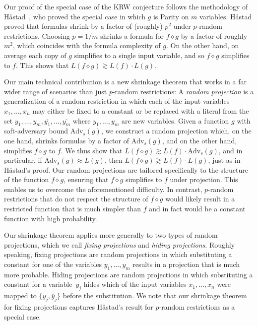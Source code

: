 \documentclass[11pt]{article}
\numberwithin{equation}{section}
\theoremstyle{definition}
\theoremstyle{plain}
\theoremstyle{definition}\newtheorem{notation}[theorem]{Notation}\theoremstyle{plain}
\newcommand{\Am}{\mathrm{Adv}_{s}}
\renewcommand{\d}{\diamond}
\theoremstyle{definition}
\theoremstyle{plain}
\begin{document}
Our proof of the special case of the KRW conjecture follows the methodology
%
of H{\aa}stad~\cite{H98},   %
who proved the special case in which
$g$ is Parity on $m$ variables. H{\aa}stad proved that formulas
shrink by a factor of (roughly) $p^{2}$ under $p$-random restrictions.
Choosing $p=1/m$ shrinks a formula for $f\d g$ by a factor of roughly
$m^{2}$, which coincides with the formula complexity of $g$. On
the other hand, on average each copy of $g$ simplifies to a single
input variable, and so $f\d g$ simplifies to $f$. This shows that
$L(f\d g)\gtrsim L(f)\cdot L(g)$.

Our main technical contribution is a new shrinkage theorem that works
in a far wider range of scenarios than just $p$-random restrictions:
A \emph{random projection }is\emph{ }a generalization of a random
restriction in which each of the input variables~$x_{1},\ldots,x_{n}$
may either be fixed to a constant or be replaced with a literal from
the set $y_{1},\ldots,y_{m},\overline{y_{1}},\ldots,\overline{y_{m}}$
where $y_{1},\ldots,y_{m}$ are new variables. Given a function $g$
with soft-adversary bound $\Am(g)$, we construct a random projection
which, on the one hand, shrinks formulas by a factor of
$\Am(g)$, and on the other hand, simplifies $f\d g$ to $f$. We
thus show that $L(f\d g)\gtrsim L(f)\cdot\Am(g)$, and in particular,
if $\Am(g)\approx L(g)$, then $L(f\d g)\gtrsim L(f)\cdot L(g)$,
just as in H{\aa}stad's proof. Our random projections are tailored
specifically to the structure of the function $f\d g$, ensuring that
$f\d g$ simplifies to $f$ under projection. This enables us to overcome
the aforementioned difficulty. In contrast, $p$-random restrictions
that do not respect the structure of $f\d g$ would likely result
in a restricted function that is much simpler than $f$ and in fact
would be a constant function with high probability.

Our shrinkage theorem applies more generally to two types of random
projections, which we call \emph{fixing projections} and \emph{hiding
projections}. Roughly speaking, fixing projections are random projections in which substituting
a constant for one of the variables $y_{1},\ldots,y_{m}$ results
in a projection that is much more probable. Hiding projections are
random projections in which substituting a constant for a variable~$y_{j}$
hides which of the input variables $x_{1},\ldots,x_{n}$ were mapped
to $\{y_{j},\overline{y}_{j}\}$ before the substitution. We note
that our shrinkage theorem for fixing projections captures H{\aa}stad's
result for $p$-random restrictions as a special case.
\end{document}
